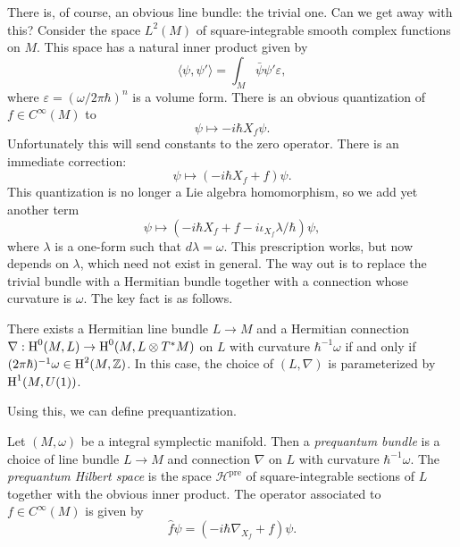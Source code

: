 \documentclass{amsart}
\begin{document}
There is, of course, an obvious line bundle: the trivial one. Can we get away with this?
Consider the space $L^2(M)$ of
square-integrable smooth complex functions on $M$. This space has a natural inner product given by
\begin{equation*}
    \langle\psi,\psi'\rangle = \int_M \bar\psi \psi' \varepsilon,
\end{equation*}
where $\varepsilon=(\omega/2\pi\hbar)^n$ is a volume form. There is an obvious quantization of
$f\in C^\infty(M)$ to
\begin{equation*}
    \psi \mapsto -i\hbar X_f\psi.
\end{equation*}
Unfortunately this will send constants to the zero operator. There is an immediate correction:
\begin{equation*}
    \psi \mapsto (-i\hbar X_f + f)\psi.
\end{equation*}
This quantization is no longer a Lie algebra homomorphism, so we add yet another term
\begin{equation*}
    \psi \mapsto (-i\hbar X_f + f -i\iota_{X_f}\lambda/\hbar)\psi,
\end{equation*}
where $\lambda$ is a one-form such that $d\lambda=\omega$. This prescription works, but now
depends on $\lambda$, which need not exist in general. The way out is to replace the
trivial bundle with a Hermitian bundle together with a connection whose curvature is $\omega$.
The key fact is as follows.

\begin{theorem}
    There exists a Hermitian line bundle $L\to M$ and a Hermitian connection $\nabla:\operatorname{H}^0(M,L)\to\operatorname{H}^0(M, L\otimes T^*M)$ on $L$ with
    curvature $\hbar^{-1}\omega$ if and only if $(2\pi\hbar)^{-1}\omega\in \operatorname{H}^2(M,\mathbb{Z})$.
    In this case, the choice of $(L,\nabla)$ is parameterized by $\operatorname{H}^1(M,U(1))$.
\end{theorem}

Using this, we can define prequantization.
\begin{definition}
    Let $(M,\omega)$ be a integral symplectic manifold. Then a \textit{prequantum bundle} is
    a choice of line bundle $L\to M$ and connection $\nabla$
    on $L$ with curvature $\hbar^{-1}\omega$.
    The \textit{prequantum Hilbert space} is the space $\mathcal{H}^\text{pre}$ of square-integrable
    sections of $L$ together with the obvious inner product. The operator associated to $f\in C^\infty(M)$
    is given by
    \begin{equation*}
        \hat f\psi = (-i\hbar\nabla_{X_f} + f)\psi.
    \end{equation*}
\end{definition}
\end{document}
